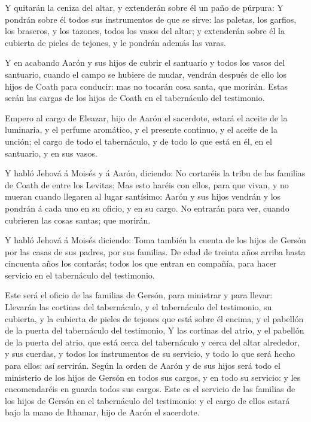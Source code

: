  Y quitarán la ceniza del altar, y extenderán sobre él un
paño de púrpura:  Y pondrán sobre él todos sus
instrumentos de que se sirve: las paletas, los garfios, los braseros, y
los tazones, todos los vasos del altar; y extenderán sobre él la
cubierta de pieles de tejones, y le pondrán además las varas.

 Y en acabando Aarón y sus hijos de cubrir el santuario y
todos los vasos del santuario, cuando el campo se hubiere de mudar,
vendrán después de ello los hijos de Coath para conducir: mas no tocarán
cosa santa, que morirán. Estas serán las cargas de los hijos de Coath en
el tabernáculo del testimonio.

 Empero al cargo de Eleazar, hijo de Aarón el sacerdote,
estará el aceite de la luminaria, y el perfume aromático, y el presente
continuo, y el aceite de la unción; el cargo de todo el tabernáculo, y
de todo lo que está en él, en el santuario, y en sus vasos.

 Y habló Jehová á Moisés y á Aarón, diciendo:
 No cortaréis la tribu de las familias de Coath de entre
los Levitas;  Mas esto haréis con ellos, para que vivan,
y no mueran cuando llegaren al lugar santísimo: Aarón y sus hijos
vendrán y los pondrán á cada uno en su oficio, y en su cargo.
 No entrarán para ver, cuando cubrieren las cosas santas;
que morirán.

 Y habló Jehová á Moisés diciendo:  Toma
también la cuenta de los hijos de Gersón por las casas de sus padres,
por sus familias.  De edad de treinta años arriba hasta
cincuenta años los contarás; todos los que entran en compañía, para
hacer servicio en el tabernáculo del testimonio.

 Este será el oficio de las familias de Gersón, para
ministrar y para llevar:  Llevarán las cortinas del
tabernáculo, y el tabernáculo del testimonio, su cubierta, y la cubierta
de pieles de tejones que está sobre él encima, y el pabellón de la
puerta del tabernáculo del testimonio,  Y las cortinas
del atrio, y el pabellón de la puerta del atrio, que está cerca del
tabernáculo y cerca del altar alrededor, y sus cuerdas, y todos los
instrumentos de su servicio, y todo lo que será hecho para ellos: así
servirán.  Según la orden de Aarón y de sus hijos será
todo el ministerio de los hijos de Gersón en todos sus cargos, y en todo
su servicio: y les encomendaréis en guarda todos sus cargos.
 Este es el servicio de las familias de los hijos de
Gersón en el tabernáculo del testimonio: y el cargo de ellos estará bajo
la mano de Ithamar, hijo de Aarón el sacerdote.

